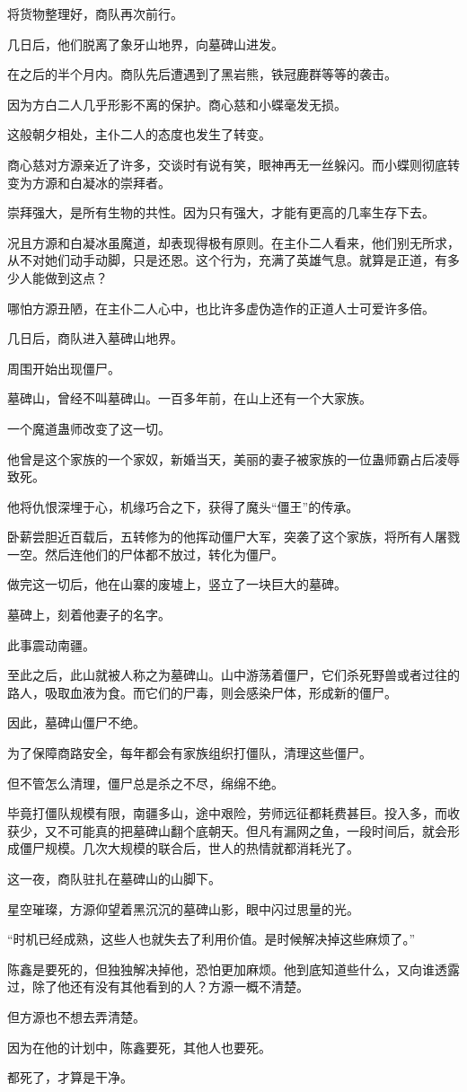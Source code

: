\begin{this_body}
将货物整理好，商队再次前行。

几日后，他们脱离了象牙山地界，向墓碑山进发。

在之后的半个月内。商队先后遭遇到了黑岩熊，铁冠鹿群等等的袭击。

因为方白二人几乎形影不离的保护。商心慈和小蝶毫发无损。

这般朝夕相处，主仆二人的态度也发生了转变。

商心慈对方源亲近了许多，交谈时有说有笑，眼神再无一丝躲闪。而小蝶则彻底转变为方源和白凝冰的崇拜者。

崇拜强大，是所有生物的共性。因为只有强大，才能有更高的几率生存下去。

况且方源和白凝冰虽魔道，却表现得极有原则。在主仆二人看来，他们别无所求，从不对她们动手动脚，只是还恩。这个行为，充满了英雄气息。就算是正道，有多少人能做到这点？

哪怕方源丑陋，在主仆二人心中，也比许多虚伪造作的正道人士可爱许多倍。

几日后，商队进入墓碑山地界。

周围开始出现僵尸。

墓碑山，曾经不叫墓碑山。一百多年前，在山上还有一个大家族。

一个魔道蛊师改变了这一切。

他曾是这个家族的一个家奴，新婚当天，美丽的妻子被家族的一位蛊师霸占后凌辱致死。

他将仇恨深埋于心，机缘巧合之下，获得了魔头“僵王”的传承。

卧薪尝胆近百载后，五转修为的他挥动僵尸大军，突袭了这个家族，将所有人屠戮一空。然后连他们的尸体都不放过，转化为僵尸。

做完这一切后，他在山寨的废墟上，竖立了一块巨大的墓碑。

墓碑上，刻着他妻子的名字。

此事震动南疆。

至此之后，此山就被人称之为墓碑山。山中游荡着僵尸，它们杀死野兽或者过往的路人，吸取血液为食。而它们的尸毒，则会感染尸体，形成新的僵尸。

因此，墓碑山僵尸不绝。

为了保障商路安全，每年都会有家族组织打僵队，清理这些僵尸。

但不管怎么清理，僵尸总是杀之不尽，绵绵不绝。

毕竟打僵队规模有限，南疆多山，途中艰险，劳师远征都耗费甚巨。投入多，而收获少，又不可能真的把墓碑山翻个底朝天。但凡有漏网之鱼，一段时间后，就会形成僵尸规模。几次大规模的联合后，世人的热情就都消耗光了。

这一夜，商队驻扎在墓碑山的山脚下。

星空璀璨，方源仰望着黑沉沉的墓碑山影，眼中闪过思量的光。

“时机已经成熟，这些人也就失去了利用价值。是时候解决掉这些麻烦了。”

陈鑫是要死的，但独独解决掉他，恐怕更加麻烦。他到底知道些什么，又向谁透露过，除了他还有没有其他看到的人？方源一概不清楚。

但方源也不想去弄清楚。

因为在他的计划中，陈鑫要死，其他人也要死。

都死了，才算是干净。

\end{this_body}

